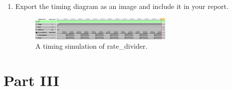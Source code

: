 \documentclass{article}
\begin{document}
\begin{enumerate}
\item Export the timing diagram as an image and include it in your report.

\begin{figure}[ht!]
    \centering
    \includegraphics[width=0.65\textwidth]{lab5_timing_rate_divider.png}
    \caption{A timing simulation of rate\_divider.}
    \label{f:rate_divider_timing}
\end{figure}
\end{enumerate}

\section{Part III}
\end{document}
